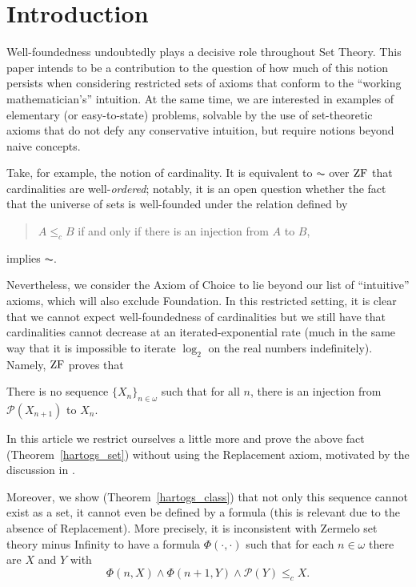\section{Introduction}
Well-foundedness undoubtedly plays a decisive role throughout Set Theory. This
paper intends to be a contribution to the question of how much of this notion persists
when considering restricted sets of axioms that conform to the “working
mathematician's” intuition. At the same time, we are interested in examples of
elementary (or easy-to-state) problems, solvable by the use of set-theoretic
axioms that do not defy any conservative intuition, but require notions beyond
naive concepts.

Take, for example, the notion of cardinality. It is equivalent to $\AC$ over
$\mathrm{ZF}$ that cardinalities are well-\emph{ordered}; notably, it is an open
question \cite[p.~312]{zbMATH07977883} \cite[Prop.~4.2]{2023arXiv231009643B} whether the fact that the universe of sets is well-founded under the
relation defined by
\begin{quote}
  $A \leq_c B$ if and only if there is an injection from $A$ to $B$,
\end{quote}
implies $\AC$.

Nevertheless, we consider the Axiom of Choice to lie beyond our list of
“intuitive” axioms, which will also exclude Foundation. In this restricted
setting, it is clear that we cannot expect well-foundedness of cardinalities but
we still have that cardinalities cannot decrease at an iterated-exponential rate
(much in the same way that it is impossible to iterate $\log_2$ on the real
numbers indefinitely). Namely, $\mathrm{ZF}$ proves \cite[Exr.~I(12)]{kunen1980} that
\begin{theorem}\label{informal_hartogs_set}
  There is no sequence $\{X_n\}_{n\in\omega}$ such that  for all $n$, there is an injection
    from $\mathcal{P}(X_{n+1})$ to $X_n$.
\end{theorem}

In this article we restrict ourselves a little more and prove the above fact
(Theorem~\ref{hartogs_set}) without using the Replacement axiom, motivated by the discussion in \cite{PedroStack}.

Moreover, we show (Theorem~\ref{hartogs_class}) that not only this sequence
cannot exist as a set, it cannot even be defined by a formula (this is relevant
due to the absence of Replacement).
More precisely, it is inconsistent with Zermelo set theory minus Infinity to have a formula $\Phi(\cdot,\cdot)$ such that for each $n\in\omega$ there are $X$ and $Y$ with
\[
	\Phi(n,X) \land \Phi(n+1,Y) \land \mathcal{P}(Y) \leq_c X.
\]

